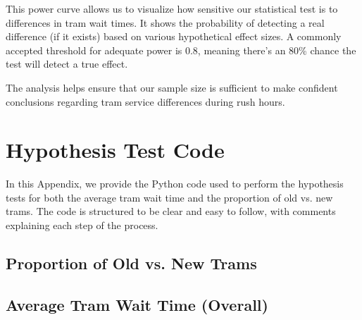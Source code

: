 \documentclass[a4paper, 10pt]{article}
\begin{document}
\begin{appendices}
				This power curve allows us to visualize how sensitive our statistical test is to differences in tram wait times. It shows the probability of detecting a real difference (if it exists) based on various hypothetical effect sizes. A commonly accepted threshold for adequate power is 0.8, meaning there's an 80\% chance the test will detect a true effect.

				\bigskip
				The analysis helps ensure that our sample size is sufficient to make confident conclusions regarding tram service differences during rush hours.
		

		\newpage
		\section{Hypothesis Test Code}
		\label{sec:hypothesis_test_code}
		  \noindent In this Appendix, we provide the Python code used to perform the hypothesis tests for both the average tram wait time and the proportion of old vs. new trams. The code is structured to be clear and easy to follow, with comments explaining each step of the process.

			\subsection*{Proportion of Old vs. New Trams}
					

			\subsection*{Average Tram Wait Time (Overall)}
				

	\end{appendices}
\end{document}
